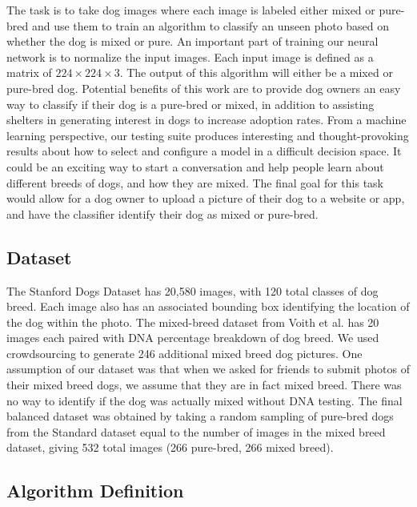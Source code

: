 \documentclass[12pt]{article}
\begin{document}
The task is to take dog images where each image is labeled either mixed or pure-bred and use them to train an algorithm to classify an unseen photo based on whether the dog is mixed or pure. An important part of training our neural network is to normalize the input images. Each input image is defined as a matrix of $224\times 224\times3$. The output of this algorithm will either be a mixed or pure-bred dog. Potential benefits of this work are to provide dog owners an easy way to classify if their dog is a pure-bred or mixed, in addition to assisting shelters in generating interest in dogs to increase adoption rates. From a machine learning perspective, our testing suite produces interesting and thought-provoking results about how to select and configure a model in a difficult decision space. It could be an exciting way to start a conversation and help people learn about different breeds of dogs, and how they are mixed. The final goal for this task would allow for a dog owner to upload a picture of their dog to a website or app, and have the classifier identify their dog as mixed or pure-bred.

\subsection{Dataset}

The Stanford Dogs Dataset has 20,580 images, with 120 total classes of dog breed. \cite{khosla2011novel} Each image also has an associated bounding box identifying the location of the dog within the photo. The mixed-breed dataset from Voith et al. \cite{voith2009comparison} has 20 images each paired with DNA percentage breakdown of dog breed. We used crowdsourcing to generate 246 additional mixed breed dog pictures. One assumption of our dataset was that when we asked for friends to submit photos of their mixed breed dogs, we assume that they are in fact mixed breed. There was no way to identify if the dog was actually mixed without DNA testing. The final balanced dataset was obtained by taking a random sampling of pure-bred dogs from the Standard dataset equal to the number of images in the mixed breed dataset, giving 532 total images (266 pure-bred, 266 mixed breed). 

\subsection{Algorithm Definition}
\end{document}
